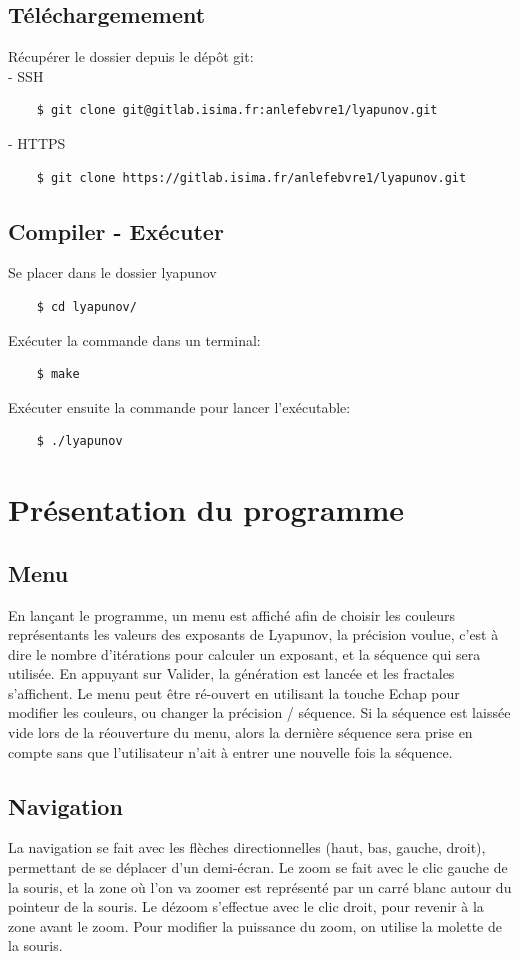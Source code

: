 \documentclass{article}
\begin{document}
	\subsection{Téléchargemement}
	\noindent Récupérer le dossier depuis le dépôt git:\\
	- SSH
	\begin{lstlisting}
	$ git clone git@gitlab.isima.fr:anlefebvre1/lyapunov.git
	\end{lstlisting}
	- HTTPS
	\begin{lstlisting}
	$ git clone https://gitlab.isima.fr/anlefebvre1/lyapunov.git
	\end{lstlisting}
	\subsection{Compiler - Exécuter}
	\noindent Se placer dans le dossier lyapunov
	\begin{lstlisting}
	$ cd lyapunov/
	\end{lstlisting}
	Exécuter la commande dans un terminal:
	\begin{lstlisting}
	$ make
	\end{lstlisting}
	Exécuter ensuite la commande pour lancer l'exécutable:
	\begin{lstlisting}
	$ ./lyapunov
	\end{lstlisting}

	\section{Présentation du programme}
	\subsection{Menu}
	En lançant le programme, un menu est affiché afin de choisir les couleurs représentants les valeurs des exposants de Lyapunov, la précision voulue, c'est à dire le nombre d'itérations pour calculer un exposant, et la séquence qui sera utilisée.
	En appuyant sur Valider, la génération est lancée et les fractales s'affichent.
	Le menu peut être ré-ouvert en utilisant la touche Echap pour modifier les couleurs, ou changer la précision / séquence.
	Si la séquence est laissée vide lors de la réouverture du menu, alors la dernière séquence sera prise en compte sans que l'utilisateur n'ait à entrer une nouvelle fois la séquence.

\subsection{Navigation}
	La navigation se fait avec les flèches directionnelles (haut, bas, gauche, droit), permettant de se déplacer d'un demi-écran.
	Le zoom se fait avec le clic gauche de la souris, et la zone où l'on va zoomer est représenté par un carré blanc autour du pointeur de la souris.
	Le dézoom s'effectue avec le clic droit, pour revenir à la zone avant le zoom.
	Pour modifier la puissance du zoom, on utilise la molette de la souris.
\end{document}
